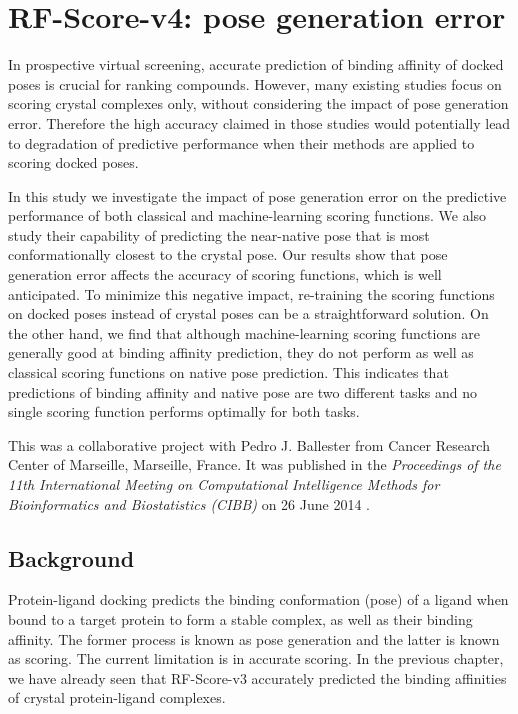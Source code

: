 \chapter{RF-Score-v4: pose generation error}
\label{rfscore4}

In prospective virtual screening, accurate prediction of binding affinity of docked poses is crucial for ranking compounds. However, many existing studies focus on scoring crystal complexes only, without considering the impact of pose generation error. Therefore the high accuracy claimed in those studies would potentially lead to degradation of predictive performance when their methods are applied to scoring docked poses.

In this study we investigate the impact of pose generation error on the predictive performance of both classical and machine-learning scoring functions. We also study their capability of predicting the near-native pose that is most conformationally closest to the crystal pose. Our results show that pose generation error affects the accuracy of scoring functions, which is well anticipated. To minimize this negative impact, re-training the scoring functions on docked poses instead of crystal poses can be a straightforward solution. On the other hand, we find that although machine-learning scoring functions are generally good at binding affinity prediction, they do not perform as well as classical scoring functions on native pose prediction. This indicates that predictions of binding affinity and native pose are two different tasks and no single scoring function performs optimally for both tasks.

This was a collaborative project with Pedro J. Ballester from Cancer Research Center of Marseille, Marseille, France. It was published in the \textit{Proceedings of the 11th International Meeting on Computational Intelligence Methods for Bioinformatics and Biostatistics (CIBB)} on 26 June 2014 \citep{1434}.

\section{Background}

Protein-ligand docking predicts the binding conformation (pose) of a ligand when bound to a target protein to form a stable complex, as well as their binding affinity. The former process is known as pose generation and the latter is known as scoring. The current limitation is in accurate scoring. In the previous chapter, we have already seen that RF-Score-v3 accurately predicted the binding affinities of crystal protein-ligand complexes.

